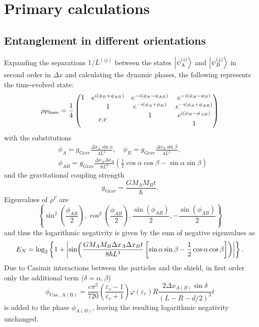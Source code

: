 \chapter{Primary calculations}

\section{Entanglement in different orientations}\label{apx:entanglement-orientation}
Expanding the separations $1/L^{(ij)}$ between the states $\ket{\psi^{(i)}_{A}}$ and $\ket{\psi^{(j)}_{B}}$ in second order in $\Delta x$ and calculating the dynamic phases, the following represents the time-evolved state:
\begin{equation}
  \rho_\mathrm{Phase} = \frac{1}{4} \begin{pmatrix}
    1 & e^{i(\phi_B + \phi_{AB})} & e^{-i(\phi_A - \phi_{AB})} & e^{-i(\phi_A - \phi_{B})} \\
    & 1 & e^{-i(\phi_A + \phi_{B})} & e^{-i(\phi_A + \phi_{AB})} \\
    \multicolumn{2}{c}{\multirow{2}{*}{c.c}} & 1 & e^{i(\phi_B - \phi_{AB})} \\
    & & & 1
  \end{pmatrix}
\end{equation}
with the substitutions
\begin{align}\label{eq:apx:phi-definition}
  &\phi_A = g_\mathrm{Grav} \frac{\Delta x_A \sin\alpha}{4L^2},\quad
  \phi_B = g_\mathrm{Grav} \frac{\Delta x_B \sin\beta}{4L^2},\\ \label{eq:apx:phi-AB}
  &\phi_{AB} = g_\mathrm{Grav} \frac{\Delta x_A \Delta x_B}{8 L^3} \left(\frac{1}{2}\cos\alpha\cos\beta - \sin\alpha\sin\beta \right)
\end{align}
and the gravitational coupling strength
\begin{equation}
  g_\mathrm{Grav} = \frac{G M_A M_B t}{\hbar} .
\end{equation}
Eigenvalues of $\rho^{\Gamma}$ are
\begin{equation}
  \left\{ \sin^2\left(\frac{\phi_{AB}}{2}\right), \cos^2\left(\frac{\phi_{AB}}{2}\right), \frac{\sin(\phi_{AB})}{2}, -\frac{\sin(\phi_{AB})}{2}\right\}
\end{equation}
and thus the logarithmic negativity is given by the sum of negative eigenvalues as
\begin{equation}
  E_N = \log_2\left\{ 1 + \left\lvert\sin(\frac{G M_A M_B \Delta x_A \Delta x_B t}{8\hbar L^3}\left[\sin\alpha\sin\beta-\frac{1}{2}\cos\alpha\cos\beta\right])\right\rvert \right\} .
\end{equation}
Due to Casimir interactions between the particles and the shield, in first order only the additional term ($\delta = \alpha, \beta$)
\begin{equation}
  \phi_\mathrm{Cas.,\,A(B)} = \frac{c \pi^3}{720}\left(\frac{\varepsilon_r - 1}{\varepsilon_r + 1}\right)\varphi(\varepsilon_r) R \frac{2 \Delta x_{A(B)} \sin\delta}{(L - R - d/2)^3} t
\end{equation}
is added to the phase $\phi_{A(B)}$, leaving the resulting logarithmic negativity unchanged.


